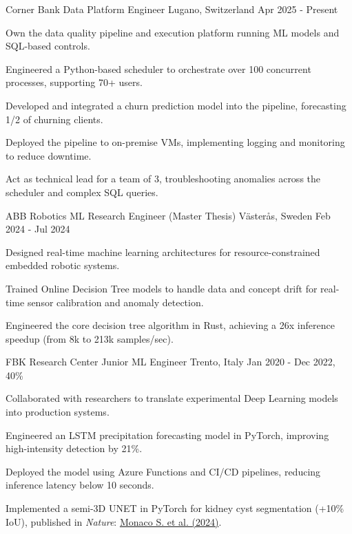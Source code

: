 

\begin{cventries}
\cventry
  {Corner Bank}
  {Data Platform Engineer}
  {Lugano, Switzerland}
  {Apr 2025 - Present}
  {
    \begin{cvitems}
      \item {Own the data quality pipeline and execution platform running ML models and SQL-based controls.}
      \item {Engineered a Python-based scheduler to orchestrate over 100 concurrent processes, supporting 70+ users.}
      \item {Developed and integrated a churn prediction model into the pipeline, forecasting 1/2 of churning clients.}
      \item {Deployed the pipeline to on-premise VMs, implementing logging and monitoring to reduce downtime.}
      \item {Act as technical lead for a team of 3, troubleshooting anomalies across the scheduler and complex SQL queries.}
    \end{cvitems}
  }
\cventry
  {ABB Robotics}
  {ML Research Engineer (Master Thesis)}
  {Västerås, Sweden}
  {Feb 2024 - Jul 2024}
  {
    \begin{cvitems}
      \item {Designed real-time machine learning architectures for resource-constrained embedded robotic systems.}
      \item {Trained Online Decision Tree models to handle data and concept drift for real-time sensor calibration and anomaly detection.}
      \item {Engineered the core decision tree algorithm in Rust, achieving a 26x inference speedup (from 8k to 213k samples/sec).}
    \end{cvitems}
  }
\cventry
  {FBK Research Center}
  {Junior ML Engineer}
  {Trento, Italy}
  {Jan 2020 - Dec 2022, 40\%}
  {
    \begin{cvitems}
      \item {Collaborated with researchers to translate experimental Deep Learning models into production systems.}
      \item {Engineered an LSTM precipitation forecasting model in PyTorch, improving high-intensity detection by 21\%.}
      \item {Deployed the model using Azure Functions and CI/CD pipelines, reducing inference latency below 10 seconds.}
      \item {Implemented a semi-3D UNET in PyTorch for kidney cyst segmentation (+10\% IoU), published in \textit{Nature}: \href{https://www.nature.com/articles/s41598-024-52677-1}{Monaco S. et al. (2024)}.}
    \end{cvitems}
  }
\end{cventries}
